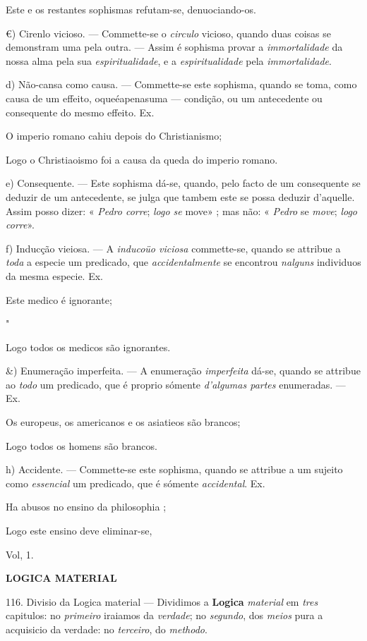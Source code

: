 Este e os restantes sophismas refutam-se, denuociando-os.

€) Cirenlo vicioso. --- Commette-se o \emph{circulo} vicioso, quando duas coisas se demonstram uma pela outra. --- Assim é sophisma provar a \emph{immortalidade} da nossa alma pela sua \emph{espiritualidade}, e a \emph{espiritualidade} pela \emph{immortalidade}.

d) Não-cansa como causa. --- Commette-se este sophisma, quando se toma, como causa de um effeito, oqueéapenasuma --- condição, ou um antecedente ou consequente do mesmo effeito. Ex.

O imperio romano cahiu depois do Christianismo;

Logo o Christiaoismo foi a causa da queda do imperio romano.

e) Consequente. --- Este sophisma dá-se, quando, pelo facto de um consequente se deduzir de um antecedente, se julga que tambem este se possa deduzir d'aquelle. Assim posso dizer: « \emph{Pedro corre}; \emph{logo se} move» ; mas não: « \emph{Pedro} se \emph{move}; \emph{logo corre}».

f) Inducção vieiosa. --- A \emph{inducoüo viciosa} commette-se, quando se attribue a \emph{toda} a especie um predicado, que \emph{accidentalmente} se encontrou \emph{nalguns} individuos da mesma especie. Ex.

Este medico é ignorante;

"

Logo todos os medicos são ignorantes.

\&) Enumeração imperfeita. --- A enumeração \emph{imperfeita} dá-se, quando se attribue ao \emph{todo} um predicado, que é proprio sómente \emph{d'algumas partes} enumeradas. --- Ex.

Os europeus, os americanos e os asiatieos são brancos;

Logo todos os homens são brancos.

h) Accidente. --- Commette-se este sophisma, quando se attribue a um sujeito como \emph{essencial} um predicado, que é sómente \emph{accidental}. Ex.

Ha abusos no ensino da philosophia ;

Logo este ensino deve eliminar-se,

Vol, 1.

\textbf{LOGICA MATERIAL}

116. Divisio da Logica material --- Dividimos a \textbf{Logica} \emph{material} em \emph{tres} capitulos: no \emph{primeiro} iraiamos da \emph{verdade}; no \emph{segundo}, dos \emph{meios} pura a acquisicio da verdade: no \emph{terceiro}, do \emph{methodo}.

